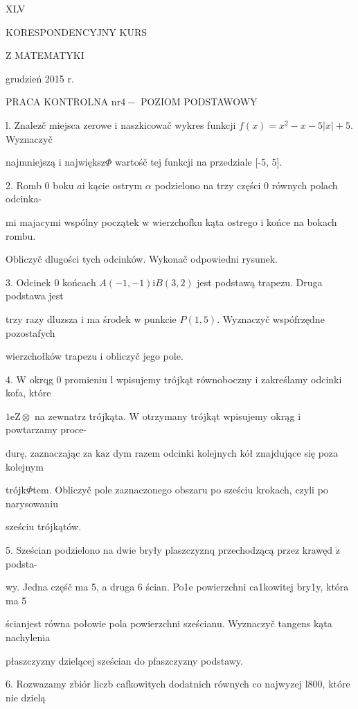 \documentclass[a4paper,12pt]{article}
\begin{document}
XLV

KORESPONDENCYJNY KURS

Z MATEMATYKI

grudzień 2015 r.

PRACA KONTROLNA $\mathrm{n}\mathrm{r} 4-$ POZIOM PODSTAWOWY

l. Znalez$\acute{}$č miejsca zerowe $\mathrm{i}$ naszkicowač wykres funkcji $f(x)=x^{2}-x-5|x|+5$. Wyznaczyč

najmniejszą $\mathrm{i}$ największ$\Phi$ wartośč tej funkcji na przedziale [-5, 5].

2. Romb $0$ boku $a\mathrm{i}$ kącie ostrym $\alpha$ podzielono na trzy części $0$ równych polach odcinka-

mi majacymi wspólny początek $\mathrm{w}$ wierzchofku kąta ostrego $\mathrm{i}$ końce na bokach rombu.

Obliczyč dlugości tych odcinków. Wykonač odpowiedni rysunek.

3. Odcinek $0$ końcach $A(-1,-1) \mathrm{i} B(3,2)$ jest podstawą trapezu. Druga podstawa jest

trzy razy dluzsza $\mathrm{i}$ ma środek $\mathrm{w}$ punkcie $P(1,5)$. Wyznaczyč wspófrzędne pozostafych

wierzchołków trapezu $\mathrm{i}$ obliczyč jego pole.

4. $\mathrm{W}$ okrqg $0$ promieniu l wpisujemy trójkąt równoboczny $\mathrm{i}$ zakreślamy odcinki kofa, które

$ 1\mathrm{e}\mathrm{Z}\otimes$ na zewnatrz trójkąta. $\mathrm{W}$ otrzymany trójkąt wpisujemy okrąg $\mathrm{i}$ powtarzamy proce-

durę, zaznaczając za $\mathrm{k}\mathrm{a}\dot{\mathrm{z}}$ dym razem odcinki kolejnych kół znajdujące się poza kolejnym

trójk$\Phi$tem. Obliczyč pole zaznaczonego obszaru po sześciu krokach, czyli po narysowaniu

sześciu trójkątów.

5. Sześcian podzielono na dwie bryły plaszczyznq przechodzącą przez krawęd $\acute{\mathrm{z}}$ podsta-

wy. Jedna częśč ma 5, a druga 6 ścian. Po1e powierzchni ca1kowitej bry1y, która ma 5

ścianjest równa połowie pola powierzchni sześcianu. Wyznaczyč tangens kąta nachylenia

płaszczyzny dzielącej sześcian do pfaszczyzny podstawy.

6. Rozwazamy zbiór liczb cafkowitych dodatnich równych co najwyzej l800, które nie dzielą
\end{document}
